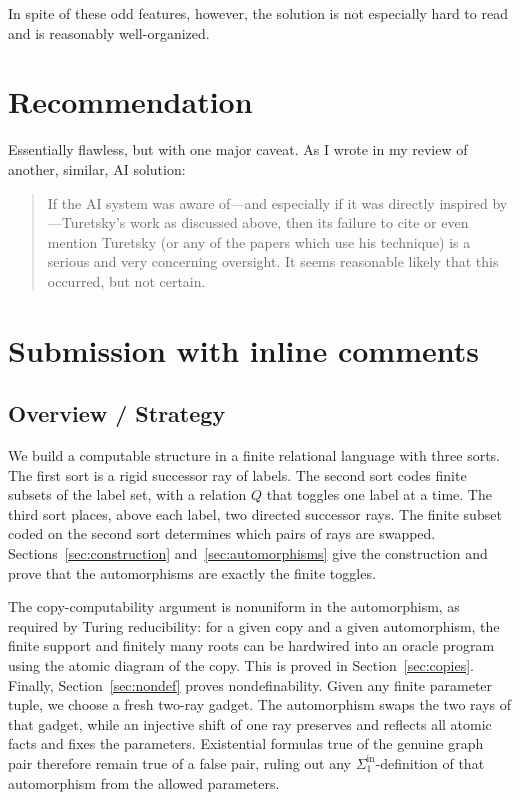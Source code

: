 \documentclass[12pt]{article}
\theoremstyle{definition}
\theoremstyle{remark}
\begin{document}
In spite of these odd features, however, the solution is not especially hard to read and is reasonably well-organized.


\section{Recommendation}
Essentially flawless, but with one major caveat. As I wrote in my review of another, similar, AI solution:
\begin{quote}
If the AI system was aware of---and especially if it was directly inspired by---Turetsky's work as discussed above, then its failure to cite or even mention Turetsky (or any of the papers which use his technique) is a serious and very concerning oversight. It seems reasonable likely that this occurred, but not certain.
\end{quote}


  \section{Submission with inline comments}

%
\date{}


\subsection*{Overview / Strategy}

We build a computable structure in a finite relational language with three sorts.  The first sort is a rigid successor ray of labels.  The second sort codes finite subsets of the label set, with a relation \(Q\) that toggles one label at a time.  The third sort places, above each label, two directed successor rays.  The finite subset coded on the second sort determines which pairs of rays are swapped.  Sections~\ref{sec:construction} and~\ref{sec:automorphisms} give the construction and prove that the automorphisms are exactly the finite toggles.

The copy-computability argument is nonuniform in the automorphism, as required by Turing reducibility: for a given copy and a given automorphism, the finite support and finitely many roots can be hardwired into an oracle program using the atomic diagram of the copy.  This is proved in Section~\ref{sec:copies}.  Finally, Section~\ref{sec:nondef} proves nondefinability.  Given any finite parameter tuple, we choose a fresh two-ray gadget.  The automorphism swaps the two rays of that gadget, while an injective shift of one ray preserves and reflects all atomic facts and fixes the parameters.  Existential formulas true of the genuine graph pair therefore remain true of a false pair, ruling out any \(\Sigma^{\mathrm{in}}_1\)-definition of that automorphism from the allowed parameters.
\end{document}
